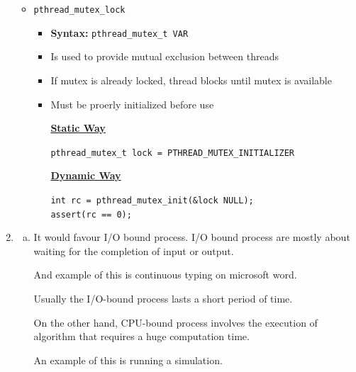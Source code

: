 \documentclass[12pt]{article}
\begin{document}
\begin{enumerate}[1.]
\begin{itemize}
        \item \texttt{pthread\_mutex\_lock}
        \begin{itemize}
            \item \textbf{Syntax:} \texttt{pthread\_mutex\_t VAR}
            \item Is used to provide mutual exclusion between threads
            \item If mutex is already locked, thread blocks until mutex is available
            \item Must be proerly initialized before use

            \bigskip

            \underline{\textbf{Static Way}}

            \bigskip

            \texttt{pthread\_mutex\_t lock = PTHREAD\_MUTEX\_INITIALIZER}

            \bigskip

            \underline{\textbf{Dynamic Way}}

            \bigskip

            \texttt{int rc = pthread\_mutex\_init(\&lock NULL);}\\
            \texttt{assert(rc == 0);}

            \bigskip

        \end{itemize}
    \end{itemize}

    \item

    \begin{enumerate}[a)]
        \item It would favour I/O bound process. I/O bound process are mostly about waiting for the completion
        of input or output.

        \bigskip

        And example of this is continuous typing on microsoft word.

        \bigskip

        Usually the I/O-bound process lasts a short period of time.

        \bigskip

        On the other hand, CPU-bound process involves the execution of algorithm that requires a
        huge computation time.

        \bigskip

        An example of this is running a simulation.


\end{enumerate}
\end{enumerate}
\end{document}

